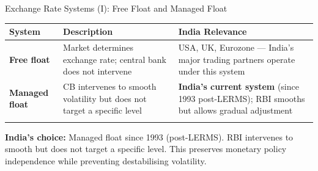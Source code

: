 \documentclass[
  ignorenonframetext,
  aspectratio=169,
]{beamer}
\makeatletter
\let\quarto@originallabel\label
\DeclareRobustCommand*{\label}[1]{\quarto@originallabel{#1}}
\makeatother
\begin{document}
\begin{frame}{Exchange Rate Systems (I): Free Float and Managed Float}
\label{exchange-rate-systems-i-free-float-and-managed-float}
\begin{longtable}[]{@{}
  >{\raggedright\arraybackslash}p{}
  >{\raggedright\arraybackslash}p{}
  >{\raggedright\arraybackslash}p{}@{}}
\toprule\noalign{}
\begin{minipage}[b]{\linewidth}\raggedright
System
\end{minipage} & \begin{minipage}[b]{\linewidth}\raggedright
Description
\end{minipage} & \begin{minipage}[b]{\linewidth}\raggedright
India Relevance
\end{minipage} \\
\midrule\noalign{}
\endhead
\textbf{Free float} & Market determines exchange rate; central bank does
not intervene & USA, UK, Eurozone --- India's major trading partners
operate under this system \\
\textbf{Managed float} & CB intervenes to smooth volatility but does not
target a specific level & \textbf{India's current system} (since 1993
post-LERMS); RBI smooths but allows gradual adjustment \\
\bottomrule\noalign{}
\end{longtable}

\textbf{India's choice:} Managed float since 1993 (post-LERMS). RBI
intervenes to smooth but does not target a specific level. This
preserves monetary policy independence while preventing destabilising
volatility.
\end{frame}
\end{document}
